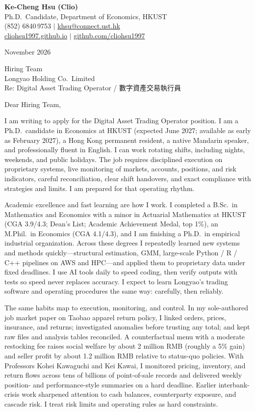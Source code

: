 \documentclass[11pt,letterpaper]{article}
\begin{document}
\noindent
{\bfseries Ke-Cheng Hsu (Clio)}\\
Ph.D.\ Candidate, Department of Economics, HKUST\\
(852) 6840\,9753 \quad $|$ \quad \href{mailto:khsu@connect.ust.hk}{khsu@connect.ust.hk}\\
\href{https://cliohsu1997.github.io/}{cliohsu1997.github.io} \quad $|$ \quad \href{https://github.com/cliohsu1997}{github.com/cliohsu1997}

\vspace{0.4em}
 November 2026

\vspace{0.3em}
\noindent
Hiring Team\\
Longyao Holding Co.\ Limited\\
Re: Digital Asset Trading Operator / 數字資產交易執行員

\vspace{0.15em}
Dear Hiring Team,

I am writing to apply for the Digital Asset Trading Operator position. I am a Ph.D.\ candidate in Economics at HKUST (expected June 2027; available as early as February 2027), a Hong Kong permanent resident, a native Mandarin speaker, and professionally fluent in English. I can work rotating shifts, including nights, weekends, and public holidays. The job requires disciplined execution on proprietary systems, live monitoring of markets, accounts, positions, and risk indicators, careful reconciliation, clear shift handovers, and exact compliance with strategies and limits. I am prepared for that operating rhythm.

Academic excellence and fast learning are how I work. I completed a B.Sc.\ in Mathematics and Economics with a minor in Actuarial Mathematics at HKUST (CGA 3.9/4.3; Dean's List; Academic Achievement Medal, top 1\%), an M.Phil.\ in Economics (CGA 4.1/4.3), and I am finishing a Ph.D.\ in empirical industrial organization. Across these degrees I repeatedly learned new systems and methods quickly---structural estimation, GMM, large-scale Python / R / C++ pipelines on AWS and HPC---and applied them to proprietary data under fixed deadlines. I use AI tools daily to speed coding, then verify outputs with tests so speed never replaces accuracy. I expect to learn Longyao's trading software and operating procedures the same way: carefully, then reliably.

The same habits map to execution, monitoring, and control. In my sole-authored job market paper on Taobao apparel return policy, I linked orders, prices, insurance, and returns; investigated anomalies before trusting any total; and kept raw files and analysis tables reconciled. A counterfactual menu with a moderate restocking fee raises social welfare by about 2 million RMB (roughly a 5\% gain) and seller profit by about 1.2 million RMB relative to status-quo policies. With Professors Kohei Kawaguchi and Kei Kawai, I monitored pricing, inventory, and return flows across tens of billions of point-of-sale records and delivered weekly position- and performance-style summaries on a hard deadline. Earlier interbank-crisis work sharpened attention to cash balances, counterparty exposure, and cascade risk. I treat risk limits and operating rules as hard constraints.
\end{document}
